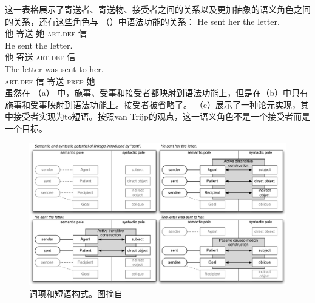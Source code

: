 这一表格展示了寄送者、寄送物、接受者之间的关系以及更加抽象的语义角色之间的关系，还有这些角色与 （）中语法功能的关系：
\eal
\ex 
\gll He sent her the letter.\\
     他 寄送 她 \textsc{art}.\textsc{def} 信\\
\ex 
\gll He sent the letter.\\
     他 寄送  \textsc{art}.\textsc{def} 信\\
\ex 
\gll The letter was sent to her.\\
       \textsc{art}.\textsc{def} 信 \passivepst{} 寄送 \textsc{prep} 她\\
\zl
虽然在 （a） 中，施事、受事和接受者都映射到语法功能上，但是在（b）中只有施事和受事映射到语法功能上。接受者被省略了。 （c）展示了一种论元实现，其中接受者实现为to短语。按照van Trijp的观点，这一语义角色不是一个接受者而是一个目标。

\begin{figure}
\includegraphics[width=\textwidth]{Figures/2011-van-Trijp.pdf}
\caption{\label{fig-as-trijp}词项和短语构式。图摘自 }
\end{figure}%

